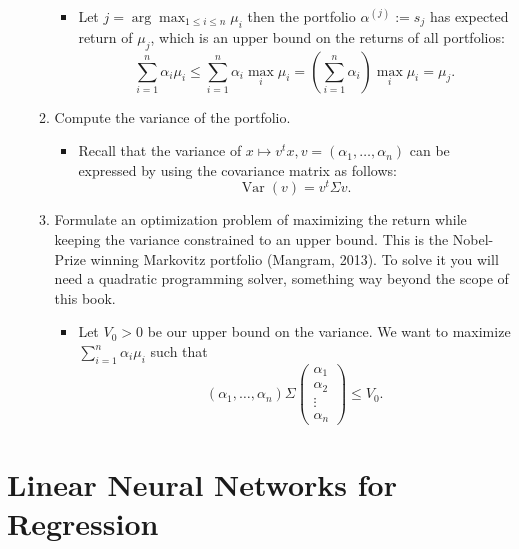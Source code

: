 \documentclass{article}
\begin{document}
\begin{enumerate}
\begin{enumerate}
				\begin{itemize}
					\item Let $j = \operatorname{arg} \max_{1 \leq i \leq n} \mu_i$ then the portfolio $\alpha^{(j)} := s_j$ has expected return of $\mu_j$, which is an upper bound on the returns of all portfolios:
					$$
					\sum_{i = 1}^n \alpha_i \mu_i \leq \sum_{i = 1}^n \alpha_i \max_i \mu_i = \left(\sum_{i = 1}^n \alpha_i\right) \max_i \mu_i = \mu_j.
					$$
				\end{itemize}
			\item Compute the variance of the portfolio.
				\begin{itemize}
					\item Recall that the variance of $x \mapsto v^t x, v = (\alpha_1, \dots, \alpha_n)$ can be expressed by using the covariance matrix as follows:
					$$
					\operatorname{Var}(v) = v^t \Sigma v.
					$$
				\end{itemize}
			\item Formulate an optimization problem of maximizing the return while keeping the variance constrained to an upper bound. This is the Nobel-Prize winning Markovitz portfolio (Mangram, 2013). To solve it you will need a quadratic programming solver, something way beyond the scope of this book.
				\begin{itemize}
					\item Let $V_0 > 0$ be our upper bound on the variance. We want to maximize $\sum_{i = 1}^n \alpha_i \mu_i$ such that
					$$
					(\alpha_1, \dots, \alpha_n) \Sigma \begin{pmatrix} \alpha_1 \\ \alpha_2 \\ \vdots \\ \alpha_n \end{pmatrix} \leq V_0.
					$$
				\end{itemize}
		\end{enumerate}
\end{enumerate}

\newpage
\section{Linear Neural Networks for Regression}
\end{document}
